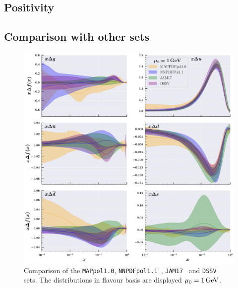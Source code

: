 \subsection*{Positivity}



\subsection{Comparison with other sets}

\begin{figure}[t!]
  \centering
  \includegraphics[width=\textwidth]{Chapters/Chapter_4/figs/competitors.pdf}
  \caption{\small{Comparison of the \texttt{MAPpol1.0}, \texttt{NNPDFpol1.1}~\cite{Nocera:2014gqa}, \texttt{JAM17}~\cite{Ethier:2017zbq} and \texttt{DSSV}~\cite{deFlorian:2008mr} sets. The distributions in flavour basis are displayed $\mu_0 = 1 \, \textrm{GeV}$. }}
  \label{fig:competitors}
\end{figure}